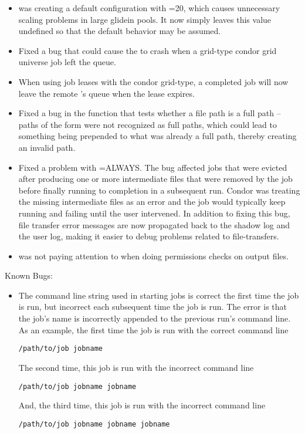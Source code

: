 \begin{itemize}
\item {} was creating a default configuration with
=20, which causes unnecessary scaling problems in large
glidein pools.  It now simply leaves this value undefined so that
the default behavior may be assumed.

\item Fixed a bug that could cause the  to crash when
a grid-type condor grid universe job left the queue.

\item When using job leases with the condor grid-type, a completed job will
now leave the remote 's queue when the lease expires.

\item Fixed a bug in the  function that tests whether
a file path is a full path -- paths of the form  were not
recognized as full paths, which could lead to something being prepended
to what was already a full path, thereby creating an invalid path.

\item Fixed a problem with =ALWAYS.  The
bug affected jobs that were evicted after producing one or more
intermediate files that were removed by the job before finally running
to completion in a subsequent run.  Condor was treating the missing
intermediate files as an error and the job would typically keep
running and failing until the user intervened.  In addition to fixing
this bug, file transfer error messages are now propagated back to the
shadow log and the user log, making it easier to debug problems
related to file-transfers.

\item {} was not paying attention to
 when doing permissions checks on
output files.

\end{itemize}

\noindent Known Bugs:

\begin{itemize}

\item The command line string used in starting  jobs is correct
the first time the job is run,
but incorrect each subsequent time the job is run.
The error is that the job's name is incorrectly appended to the 
previous run's command line.
As an example, the first time the job is run with the correct command line
\begin{verbatim}
/path/to/job jobname
\end{verbatim}
The second time, this job is run with the incorrect command line
\begin{verbatim}
/path/to/job jobname jobname
\end{verbatim}
And, the third time, this job is run with the incorrect command line
\begin{verbatim}
/path/to/job jobname jobname jobname
\end{verbatim}


\end{itemize}


